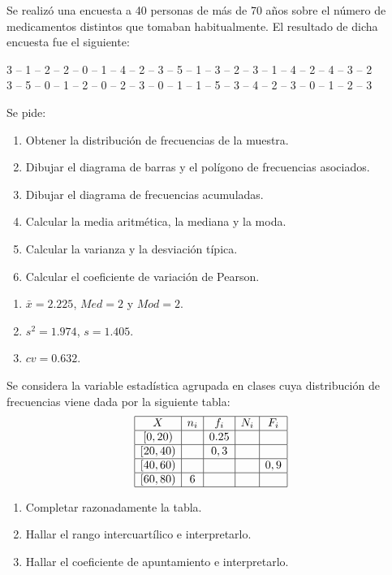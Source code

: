 {Se realizó una encuesta a 40 personas de más de 70 años sobre el número de medicamentos distintos que tomaban habitualmente.
El resultado de dicha encuesta fue el siguiente:
\begin{center}
3 -- 1 -- 2 -- 2 -- 0 -- 1 -- 4 -- 2 -- 3 -- 5 -- 1 -- 3 -- 2 -- 3 -- 1 -- 4 -- 2 -- 4 -- 3 -- 2 \\
3 -- 5 -- 0 -- 1 -- 2 -- 0 -- 2 -- 3 -- 0 -- 1 -- 1 -- 5 -- 3 -- 4 -- 2 -- 3 -- 0 -- 1 -- 2 -- 3
\end{center}
Se pide:
\begin{enumerate}
\item Obtener la distribución de frecuencias de la muestra.
\item Dibujar el diagrama de barras y el polígono de frecuencias asociados.
\item Dibujar el diagrama de frecuencias acumuladas.
\item Calcular la media aritmética, la mediana y la moda.
\item Calcular la varianza y la desviación típica.
\item Calcular el coeficiente de variación de Pearson.
\end{enumerate}
}
{\begin{enumerate}[start=4]
\item $ \bar{x} = 2.225$, $Med =2$ y $Mod= 2$.
\item $s^2 = 1.974$, $s= 1.405$.
\item $cv = 0.632$.
\end{enumerate}
}
{}


{Se considera la variable estadística agrupada en clases cuya distribución de frecuencias viene dada por la siguiente tabla:
\[
\begin{array}{|c|c|c|c|c|}
\hline
X & n_i & f_i & N_i & F_i\\
\hline
[0,20) & & 0.25 & &  \\
\hline
[20,40) & & 0,3 & & \\
\hline
[40,60) &  &  & &  0,9\\
\hline
[60,80) & 6 & & & \\
\hline
\end{array}
\]

\begin{enumerate}
\item Completar razonadamente la tabla.
\item Hallar el rango intercuartílico e interpretarlo.
\item Hallar el coeficiente de apuntamiento e interpretarlo.
\end{enumerate}
}


